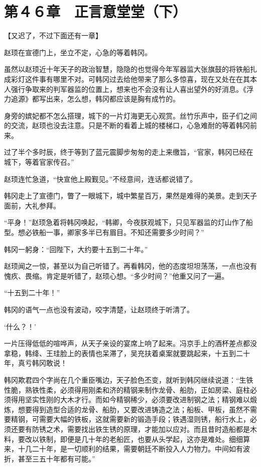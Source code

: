 \section{第４６章　正言意堂堂（下）}

【又迟了，不过下面还有一章】

赵顼在宣德门上，坐立不定，心急的等着韩冈。

虽然以赵顼近十年天子的政治智慧，隐隐的也觉得今年军器监大张旗鼓的将铁船扎成彩灯这件事有哪里不对。可韩冈过去给他带来了那么多惊喜，现在又处在在其本人强行争取来的判军器监的位置上，想来也不会没有让人喜出望外的好消息。《浮力追源》都写出来，怎么想，韩冈都应该是胸有成竹的。

身旁的嫔妃都不怎么搭理，城下的一片灯海更无心观赏。丝竹乐声中，臣子们之间的交流，赵顼也没去注意。只是不断的看着上城的楼梯口，心急难耐的等着韩冈前来。

过了半个多时辰，终于等到了蓝元震脚步匆匆的走上来缴旨，“官家，韩冈已经在城下，等着官家传召。”

赵顼连忙急道，“快宣他上殿觐见。”不经意间，连话都说错了。

韩冈走上了宣德门，瞥了一眼城下，城中繁星百万，果然是难得的美景。走到天子面前，大礼参拜。

“平身！”赵顼急着将韩冈唤起，“韩卿，今夜朕观城下，只见军器监的灯山作了船型。想必铁船一事，卿家多半已有眉目。不知还需要多少时间？”

韩冈一躬身：“回陛下，大约要十五到二十年。”

赵顼闻之一惊，甚至以为自己听错了。再看韩冈，他的态度坦坦荡荡，一点也没有愧疚、畏缩。肯定是听错了，赵顼心想。“多少时间？”他重又问了一遍。

“十五到二十年！”

韩冈的语气一点也没有波动，咬字清楚，让赵顼终于听清了。

‘什么？！’

一片压得低低的喧哗声，从天子亲设的宴席上响了起来。冯京手上的酒杯差点都没拿稳，韩绛、王珪脸上的表情也呆滞了，吴充扶着桌案就要跳起来，十五到二十年，真亏韩冈敢说！

韩冈欺君四个字尚在几个重臣嘴边，天子脸色丕变，就听到韩冈继续说道：“生铁性脆，熟铁性柔，必须得用刚柔和济的精钢来制作龙骨、船肋，正如房梁、庭柱必须得用坚实性刚的大木才行。而如今精钢稀少，必须要改进制钢之法；精钢难以煅炼，想要得到造型合适的龙骨、船肋，又要改进铸造之法；船板、甲板，虽然不需要精钢，可需要大幅的铁板，这就需要新的锻造手段；铁遇湿则锈，船行水上，必须还要有防锈之术，需要找出铁生锈的原理，才能加以应对。而且昔时造船都是木料，要改以铁制，即便是几十年的老船匠，也要从头学起，这亦是难处。细细算来，十几二十年，是一切顺利的结果，需要朝廷不断投入人力物力。中间如有波折，甚至三五十年都有可能。”

